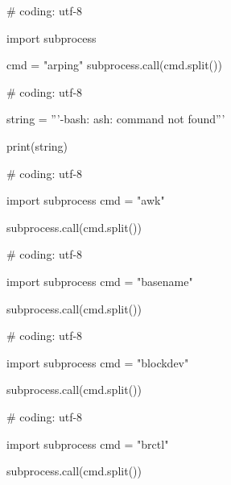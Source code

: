\begin{mylisting}[label={lst:acpid},language=sh,caption=arping]
# coding: utf-8

import subprocess

cmd = "arping"
subprocess.call(cmd.split())

\end{mylisting}


\begin{mylisting}[label={lst:acpid},language=sh,caption=ash]
# coding: utf-8

string = '''-bash: ash: command not found'''

print(string)

\end{mylisting}



\begin{mylisting}[label={lst:acpid},language=sh,caption=awk]

# coding: utf-8

import subprocess
cmd = "awk"

subprocess.call(cmd.split())

\end{mylisting}

\begin{mylisting}[label={lst:acpid},language=sh,caption=basename]

# coding: utf-8

import subprocess
cmd = "basename"

subprocess.call(cmd.split())

\end{mylisting}

\begin{mylisting}[label={lst:acpid},language=sh,caption=blockdev]

# coding: utf-8

import subprocess
cmd = "blockdev"

subprocess.call(cmd.split())

\end{mylisting}

\begin{mylisting}[label={lst:acpid},language=sh,caption=brctl]

# coding: utf-8

import subprocess
cmd = "brctl"

subprocess.call(cmd.split())

\end{mylisting}

